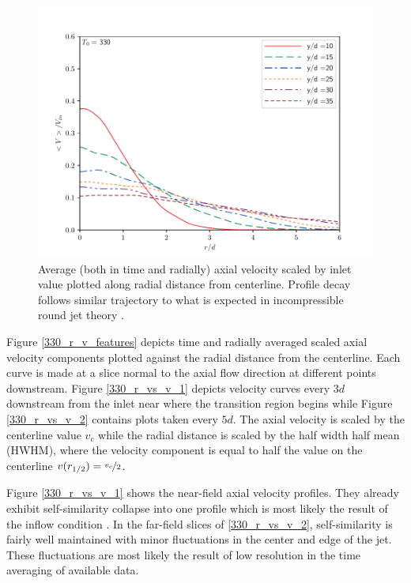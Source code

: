 \begin{figure}[htbp!]
\begin{center}
	\includegraphics[scale=.7]{figures/Plots/radial/slices_5/same_ambient/ur_u_in_vs_r_d.pdf}
	\caption{Average (both in time and radially) axial velocity scaled by inlet value plotted along radial distance from centerline. Profile decay follows similar trajectory to what is expected in incompressible round jet theory \cite{Pope}.} \label{330_centerline_decay}
\end{center}
\end{figure}

Figure \ref{330_r_v_features} depicts time and radially averaged scaled axial velocity components plotted against the radial distance from the centerline. Each curve is made at a slice normal to the axial flow direction at different points downstream. Figure \ref{330_r_vs_v_1} depicts velocity curves every $3d$ downstream from the inlet near where the transition region begins while Figure \ref{330_r_vs_v_2} contains plots taken every $5d$. The axial velocity is scaled by the centerline value $v_c$ while the radial distance is scaled by the half width half mean (HWHM), where the velocity component is equal to half the value on the centerline $v(r_{1/2}) = \nicefrac{v_c}{2}$.

Figure \ref{330_r_vs_v_1} shows the near-field axial velocity profiles. They already exhibit self-similarity collapse into one profile which is most likely the result of the inflow condition \cite{}. In the far-field slices of \ref{330_r_vs_v_2}, self-similarity is fairly well maintained with minor fluctuations in the center and edge of the jet. These fluctuations are most likely the result of low resolution in the time averaging of available data. 

